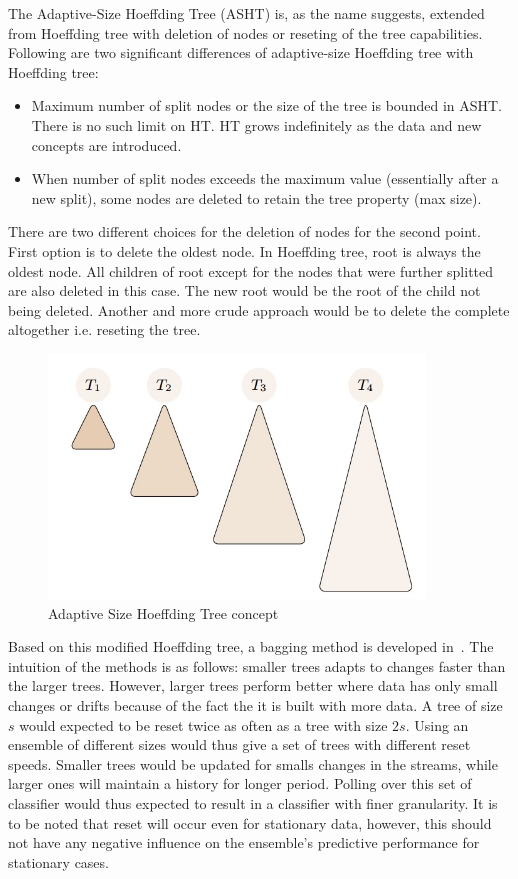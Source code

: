 The Adaptive-Size Hoeffding Tree (ASHT) is, as the name suggests, extended from Hoeffding tree with deletion of nodes or reseting of the tree capabilities. Following are two significant differences of adaptive-size Hoeffding tree with Hoeffding tree: 
\begin{itemize}
    \item Maximum number of split nodes or the size of the tree is bounded in ASHT. There is no such limit on HT. HT grows indefinitely as the data and new concepts are introduced.
    \item When number of split nodes exceeds the maximum value (essentially after a new split), some nodes are deleted to retain the tree property (max size).
\end{itemize}
There are two different choices for the deletion of nodes for the second point. First option is to delete the oldest node. In Hoeffding tree, root is always the oldest node. All children of root except for the nodes that were further splitted are also deleted in this case. The new root would be the root of the child not being deleted. Another and more crude approach would be to delete the complete altogether i.e. reseting the tree. 

\begin{figure}[htbp]
    \begin{center}
        \includegraphics[width=10.0cm]{figs/asht.jpg}
        \caption{Adaptive Size Hoeffding Tree concept}
        \label{fig:bg:asht}
    \end{center}
\end{figure}

Based on this modified Hoeffding tree, a bagging method is developed in~\cite{bifet09:asht}. The intuition of the methods is as follows: smaller trees adapts to changes faster than the larger trees. However, larger trees perform better where data has only small changes or drifts because of the fact the it is built with more data. A tree of size $s$ would expected to be reset twice as often as a tree with size $2s$. Using an ensemble of different sizes would thus give a set of trees with different reset speeds. Smaller trees would be updated for smalls changes in the streams, while larger ones will maintain a history for longer period. Polling over this set of classifier would thus expected to result in a classifier with finer granularity. It is to be noted that reset will occur even for stationary data, however, this should not have any negative influence on the ensemble's predictive performance for stationary cases.

